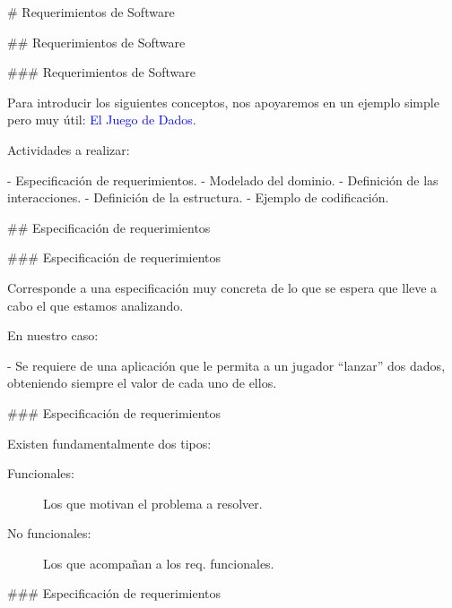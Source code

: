 # Requerimientos de Software

## Requerimientos de Software

### Requerimientos de Software


Para introducir los siguientes conceptos, nos apoyaremos en un ejemplo simple pero muy útil:
\textcolor{blue}{El Juego de Dados}.\newline

Actividades a realizar:

- Especificación de requerimientos.
- Modelado del dominio.
- Definición de las interacciones.
- Definición de la estructura.
- Ejemplo de codificación.


## Especificación de requerimientos

### Especificación de requerimientos


Corresponde a una especificación muy concreta de lo que se espera que lleve a cabo el
 que estamos analizando.\newline

En nuestro caso:

- Se requiere de una aplicación que le permita a un jugador ``lanzar'' dos dados, obteniendo
siempre el valor de cada uno de ellos.


### Especificación de requerimientos


Existen fundamentalmente dos tipos:

\begin{rboxx}{}
\begin{description}
    \item[Funcionales:] Los que motivan el problema a resolver.
\end{description}
\end{rboxx}

\begin{rboxx}{}
\begin{description}
    \item[No funcionales:] Los que acompañan a los req. funcionales.
\end{description}
\end{rboxx}

### Especificación de requerimientos


